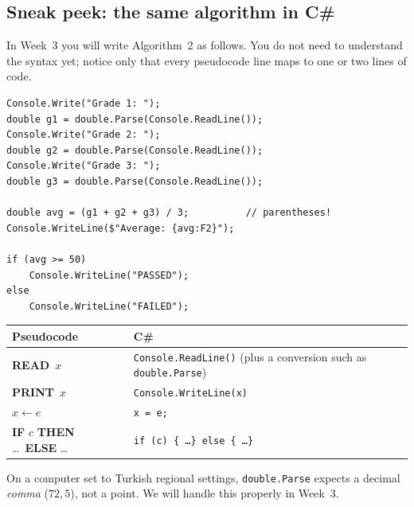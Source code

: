 \documentclass[11pt,a4paper]{article}
\newcommand{\READ}{\textbf{READ}\ }
\newcommand{\PRINT}{\textbf{PRINT}\ }
\begin{document}
\subsection{Sneak peek: the same algorithm in C\#}
In Week~3 you will write Algorithm~2 as follows. You do not need to understand the syntax yet; notice only that every pseudocode line maps to one or two lines of code.
\begin{lstlisting}
Console.Write("Grade 1: ");
double g1 = double.Parse(Console.ReadLine());
Console.Write("Grade 2: ");
double g2 = double.Parse(Console.ReadLine());
Console.Write("Grade 3: ");
double g3 = double.Parse(Console.ReadLine());

double avg = (g1 + g2 + g3) / 3;          // parentheses!
Console.WriteLine($"Average: {avg:F2}");

if (avg >= 50)
    Console.WriteLine("PASSED");
else
    Console.WriteLine("FAILED");
\end{lstlisting}
\begin{center}\small
\begin{tabular}{ll}
\toprule
Pseudocode & C\#\\ \midrule
\READ $x$ & \texttt{Console.ReadLine()} (plus a conversion such as \texttt{double.Parse})\\
\PRINT $x$ & \texttt{Console.WriteLine(x)}\\
$x \gets e$ & \texttt{x = e;}\\
\textbf{IF} $c$ \textbf{THEN} \dots\ \textbf{ELSE} \dots & \texttt{if (c) \{ \dots \} else \{ \dots \}}\\ \bottomrule
\end{tabular}
\end{center}
\begin{notebox}
On a computer set to Turkish regional settings, \texttt{double.Parse} expects a decimal \emph{comma} ($72{,}5$), not a point. We will handle this properly in Week~3.
\end{notebox}

\end{document}

